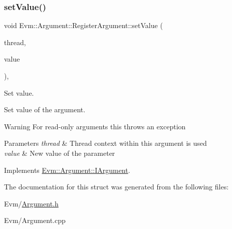 \subsubsection{\texorpdfstring{set\+Value()}{setValue()}}
{\footnotesize\ttfamily void Evm\+::\+Argument\+::\+Register\+Argument\+::set\+Value (\begin{DoxyParamCaption}\item[{\mbox{\hyperlink{struct_evm_1_1_thread_context}{Thread\+Context}} \&}]{thread,  }\item[{uint64\+\_\+t}]{value }\end{DoxyParamCaption})\hspace{0.3cm}{\ttfamily [override]}, {\ttfamily [virtual]}}



Set value. 

Set value of the argument. \begin{DoxyWarning}{Warning}
For read-\/only arguments this throws an exception 
\end{DoxyWarning}

\begin{DoxyParams}{Parameters}
{\em thread} & Thread context within this argument is used \\
\hline
{\em value} & New value of the parameter \\
\hline
\end{DoxyParams}


Implements \mbox{\hyperlink{struct_evm_1_1_argument_1_1_i_argument_a24e4c76f2750e664e3895d2ff4b9146d}{Evm\+::\+Argument\+::\+I\+Argument}}.



The documentation for this struct was generated from the following files\+:\begin{DoxyCompactItemize}
\item 
Evm/\mbox{\hyperlink{_argument_8h}{Argument.\+h}}\item 
Evm/Argument.\+cpp\end{DoxyCompactItemize}
